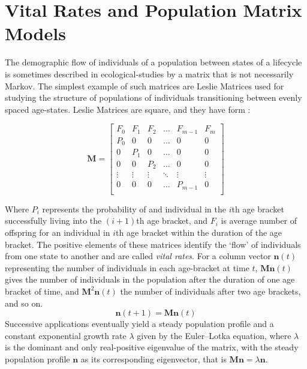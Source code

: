 \section{Vital Rates and Population Matrix Models}\label{sec:2}

The demographic flow of individuals of a population between states of a lifecycle is sometimes described in ecological-studies by a matrix that is not necessarily Markov.
The simplest example of such matrices are Leslie Matrices used for studying the structure of populations of individuals transitioning between evenly spaced age-states.
Leslie Matrices are square, and they have form \cite{leslie}:

\begin{equation*}
\mathbf{M}=\begin{bmatrix}
    F_0 & F_1 & F_2 & \dots & F_{m-1} & F_m  \\
    P_0 &  0  &  0  & \dots &  0      &  0   \\
     0  & P_1 &  0  & \dots &  0      &  0   \\
     0  &  0  & P_2 & \dots &  0      &  0   \\
    \vdots & \vdots & \vdots & \ddots & \vdots & \vdots \\
     0  &  0  &  0  & \dots  & P_{m-1} &  0   \\
\end{bmatrix}
\end{equation*}

Where $P_i$ represents the probability of and individual in the $i$th age bracket successfully living into the $(i+1)$th age bracket, and $F_i$ is average number of offspring for an individual in $i$th age bracket within the duration of the age bracket.
The positive elements of these matrices identify the `flow' of individuals from one state to another and are called \textit{vital rates}.
For a column vector $\mathbf{n}(t)$ representing the number of individuals in each age-bracket at time $t$, $\mathbf{M}\mathbf{n}(t)$ gives the number of individuals in the population after the duration of one age bracket of time, and $\mathbf{M}^2\mathbf{n}(t)$ the number of individuals after two age brackets, and so on. $$\mathbf{n}(t+1)=\mathbf{M}\mathbf{n}(t)$$
Successive applications eventually yield a steady population profile and a constant exponential growth rate $\lambda$ given by the Euler–Lotka equation, where $\lambda$ is the dominant and only real-positive eigenvalue of the matrix, with the steady population profile $\mathbf{n}$ as its corresponding eigenvector, that is $\mathbf{M}\mathbf{n}=\lambda \mathbf{n}$.

